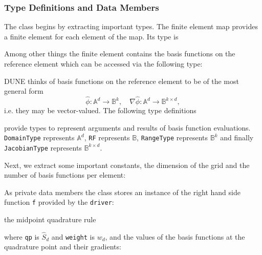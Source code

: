 \documentclass[a4paper,12pt]{article}
\begin{document}
\subsubsection*{Type Definitions and Data Members}

The class begins by extracting important types. The finite element
map provides a finite element for each element of the map. Its type is


Among other things the finite element contains the basis functions
on the reference element which can be accessed via the following type:


DUNE thinks of basis functions on the reference element to be of
the most general form 
$$\hat\phi : \mathbb{A}^d \to \mathbb{B}^k, \quad 
\nabla\hat\phi : \mathbb{A}^d \to \mathbb{B}^{k\times d},$$
i.e. they may be vector-valued. The following type definitions

provide types to represent arguments and results of basis function
evaluations. \lstinline{DomainType} represents $\mathbb{A}^d$,
\lstinline{RF} represents $\mathbb{B}$, \lstinline{RangeType}
represents $\mathbb{B}^k$ and finally \lstinline{JacobianType}
represents $\mathbb{B}^{k\times d}$.

Next, we extract some important constants, the dimension 
of the grid and the number of basis functions per element:


As private data members the class stores an instance of the right
hand side function \lstinline{f} provided by the \lstinline{driver}:

the midpoint quadrature rule

where \lstinline{qp} is $\hat S_d$ and \lstinline{weight} is
$w_d$, and the values of the basis functions at the quadrature
point and their gradients:

\end{document}
